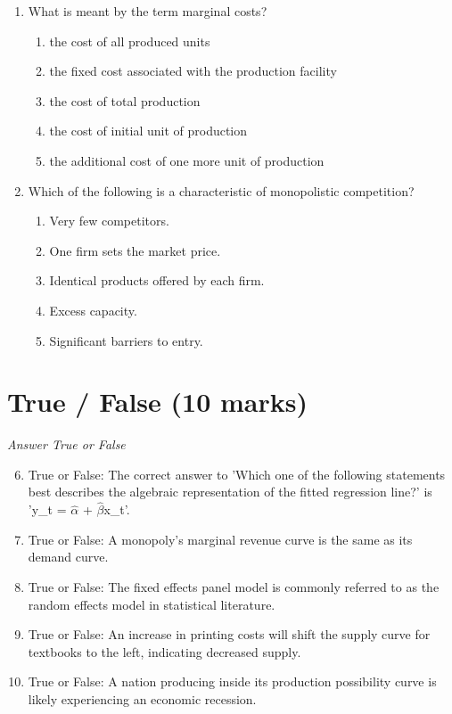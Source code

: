 \documentclass[12pt]{article}
\begin{document}
\begin{enumerate}[label=\arabic*.]
\begin{enumerate}[label=(\alph*)]
    \item If both the demand and supply curves are price elastic
    \item If the demand curve is price elastic and the supply curve is price inelastic
\end{enumerate}
\item What is meant by the term marginal costs?
\begin{enumerate}[label=(\alph*)]
    \item the cost of all produced units
    \item the fixed cost associated with the production facility
    \item the cost of total production
    \item the cost of initial unit of production
    \item the additional cost of one more unit of production
\end{enumerate}
\item Which of the following is a characteristic of monopolistic competition?
\begin{enumerate}[label=(\alph*)]
    \item Very few competitors.
    \item One firm sets the market price.
    \item Identical products offered by each firm.
    \item Excess capacity.
    \item Significant barriers to entry.
\end{enumerate}
\end{enumerate}

\section*{True / False (10 marks)}
\textit{Answer True or False}
\begin{enumerate}[label=\arabic*.]
\setcounter{enumi}{5}
\item True or False: The correct answer to 'Which one of the following statements best describes the algebraic representation of the fitted regression line?' is 'y\_t = \ensuremath{\hat{\alpha}} + \ensuremath{\hat{\beta}}x\_t'.
\item True or False: A monopoly's marginal revenue curve is the same as its demand curve.
\item True or False: The fixed effects panel model is commonly referred to as the random effects model in statistical literature.
\item True or False: An increase in printing costs will shift the supply curve for textbooks to the left, indicating decreased supply.
\item True or False: A nation producing inside its production possibility curve is likely experiencing an economic recession.
\end{enumerate}
\end{document}
